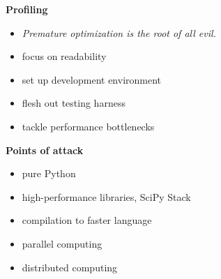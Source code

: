 \begin{frame}\textbf{Profiling}\vspace{0.3cm}

\begin{itemize}\setlength\itemsep{1em}
    \item \textit{Premature optimization is the root of all evil.}
    \item focus on readability
    \item set up development environment
    \item flesh out testing harness
    \item tackle performance bottlenecks
\end{itemize}

\end{frame}
\begin{frame}\textbf{Points of attack}\vspace{0.3cm}

\begin{itemize}\setlength\itemsep{1em}
    \item pure Python
    \item high-performance libraries, SciPy Stack
    \item compilation to faster language
    \item parallel computing
    \item distributed computing
\end{itemize}

\end{frame}
\begin{frame}
	\begin{figure}[htp]\centering
	\end{figure}
\end{frame}
